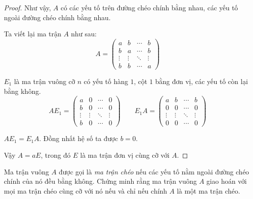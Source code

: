 \documentclass[class=linearalgebra,crop=false]{standalone}
\begin{document}
\begin{proof}
    \par Như vậy, $A$ có các yếu tố trên đường chéo chính bằng nhau, các yếu tố ngoài đường chéo chính bằng nhau.
    \par Ta viết lại ma trận $A$ như sau:
    \[
        A =
        \begin{pmatrix}
            a      & b      & \cdots & b      \\
            b      & a      & \cdots & b      \\
            \vdots & \vdots & \ddots & \vdots \\
            b      & b      & \cdots & a
        \end{pmatrix}
    \]
    \par $E_{1}$ là ma trận vuông cỡ $n$ có yếu tố hàng $1$, cột $1$ bằng đơn vị, các yếu tố còn lại bằng không.
    \[
        AE_{1} =
        \begin{pmatrix}
            a      & 0      & \cdots & 0      \\
            b      & 0      & \cdots & 0      \\
            \vdots & \vdots & \ddots & \vdots \\
            b      & 0      & \cdots & 0
        \end{pmatrix}
        \qquad
        E_{1}A =
        \begin{pmatrix}
            a      & b      & \cdots & b      \\
            0      & 0      & \cdots & 0      \\
            \vdots & \vdots & \ddots & \vdots \\
            0      & 0      & \cdots & 0
        \end{pmatrix}
    \]
    \par $AE_{1} = E_{1}A$. Đồng nhất hệ số ta được $b = 0$.
    \par Vậy $A = aE$, trong đó $E$ là ma trận đơn vị cùng cỡ với $A$.
\end{proof}

\begin{exercise}
    Ma trận vuông $A$ được gọi là \textit{ma trận chéo} nếu các yếu tố nằm ngoài đường chéo chính của nó đều bằng không. Chứng minh rằng ma trận vuông $A$ giao hoán với mọi ma trận chéo cùng cỡ với nó nếu và chỉ nếu chính $A$ là một ma trận chéo.
\end{exercise}
\end{document}
